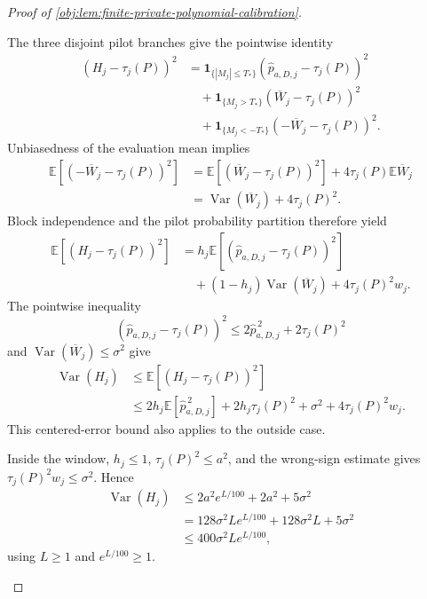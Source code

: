 \documentclass[11pt]{article}
\begin{document}
\begin{proof}[Proof of \cref{obj:lem:finite-private-polynomial-calibration}]
\begin{enumerate}
The three disjoint pilot branches give the pointwise identity
\[
\begin{aligned}
(H_j-\tau_j(P))^2
&=\mathbf1_{\{|M_j|\le T_*\}}
       (\widehat p_{a,D,j}-\tau_j(P))^2\\
&\quad+\mathbf1_{\{M_j>T_*\}}
       (\overline W_j-\tau_j(P))^2\\
&\quad+\mathbf1_{\{M_j<-T_*\}}
       (-\overline W_j-\tau_j(P))^2.
\end{aligned}
\]
Unbiasedness of the evaluation mean implies
\[
\begin{aligned}
\mathbb E[(-\overline W_j-\tau_j(P))^2]
&=\mathbb E[(\overline W_j-\tau_j(P))^2]
   +4\tau_j(P)\mathbb E\overline W_j\\
&=\operatorname{Var}(\overline W_j)+4\tau_j(P)^2.
\end{aligned}
\]
Block independence and the pilot probability partition therefore yield
\[
\begin{aligned}
\mathbb E[(H_j-\tau_j(P))^2]
&=h_j\mathbb E[(\widehat p_{a,D,j}-\tau_j(P))^2]\\
&\quad+(1-h_j)\operatorname{Var}(\overline W_j)
       +4\tau_j(P)^2w_j.
\end{aligned}
\]
The pointwise inequality
\[
(\widehat p_{a,D,j}-\tau_j(P))^2
\le2\widehat p_{a,D,j}^{\,2}+2\tau_j(P)^2
\]
and \(\operatorname{Var}(\overline W_j)\le\sigma^2\) give
\[
\begin{aligned}
\operatorname{Var}(H_j)
&\le\mathbb E[(H_j-\tau_j(P))^2]\\
&\le2h_j\mathbb E[\widehat p_{a,D,j}^{\,2}]
     +2h_j\tau_j(P)^2+\sigma^2+4\tau_j(P)^2w_j.
\end{aligned}
\]
This centered-error bound also applies to the outside case.

Inside the window, \(h_j\le1\), \(\tau_j(P)^2\le a^2\), and the wrong-sign estimate gives \(\tau_j(P)^2w_j\le\sigma^2\). Hence
\[
\begin{aligned}
\operatorname{Var}(H_j)
&\le2a^2e^{L/100}+2a^2+5\sigma^2\\
&=128\sigma^2Le^{L/100}+128\sigma^2L+5\sigma^2\\
&\le400\sigma^2Le^{L/100},
\end{aligned}
\]
using \(L\ge1\) and \(e^{L/100}\ge1\).


\end{enumerate}
\end{proof}
\end{document}
